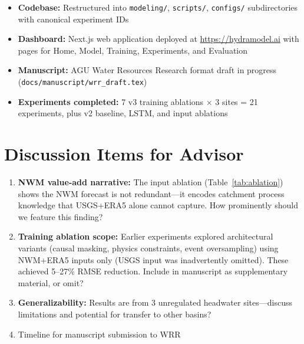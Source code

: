 \documentclass[11pt]{article}
\begin{document}
\begin{itemize}
    \item \textbf{Codebase:} Restructured into \texttt{modeling/}, \texttt{scripts/}, \texttt{configs/} subdirectories with canonical experiment IDs
    \item \textbf{Dashboard:} Next.js web application deployed at \url{https://hydramodel.ai} with pages for Home, Model, Training, Experiments, and Evaluation
    \item \textbf{Manuscript:} AGU Water Resources Research format draft in progress (\texttt{docs/manuscript/wrr\_draft.tex})
    \item \textbf{Experiments completed:} 7 v3 training ablations $\times$ 3 sites = 21 experiments, plus v2 baseline, LSTM, and input ablations
\end{itemize}

\section{Discussion Items for Advisor}

\begin{enumerate}
    \item \textbf{NWM value-add narrative:} The input ablation (Table~\ref{tab:ablation}) shows the NWM forecast is not redundant---it encodes catchment process knowledge that USGS+ERA5 alone cannot capture. How prominently should we feature this finding?
    \item \textbf{Training ablation scope:} Earlier experiments explored architectural variants (causal masking, physics constraints, event oversampling) using NWM+ERA5 inputs only (USGS input was inadvertently omitted). These achieved 5--27\% RMSE reduction. Include in manuscript as supplementary material, or omit?
    \item \textbf{Generalizability:} Results are from 3 unregulated headwater sites---discuss limitations and potential for transfer to other basins?
    \item Timeline for manuscript submission to WRR
\end{enumerate}
\end{document}
